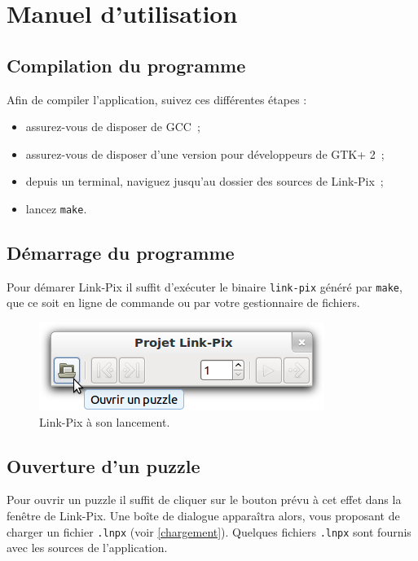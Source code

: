 \chapter{Manuel d’utilisation}

\section{Compilation du programme}

Afin de compiler l'application, suivez ces différentes étapes :
\begin{itemize}
	\item assurez-vous de disposer de GCC~;
	\item assurez-vous de disposer d'une version pour développeurs de GTK+ 2~;
	\item depuis un terminal, naviguez jusqu'au dossier des sources de Link-Pix~;
	\item lancez \verb|make|.
\end{itemize}

\section{Démarrage du programme}

Pour démarer Link-Pix il suffit d'exécuter le binaire \verb|link-pix| généré par \verb|make|, que ce soit en ligne de commande ou par votre gestionnaire de fichiers.

\begin{figure}[h!]
      \centering
      \includegraphics[scale=0.5]{gui-1}
      \caption{Link-Pix à son lancement.}
\end{figure}

\section{Ouverture d'un puzzle}

Pour ouvrir un puzzle il suffit de cliquer sur le bouton prévu à cet effet dans la fenêtre de Link-Pix.
Une boîte de dialogue apparaîtra alors, vous proposant de charger un fichier \verb|.lnpx| (voir \ref{chargement}). Quelques fichiers \verb|.lnpx| sont fournis avec les sources de l'application.

